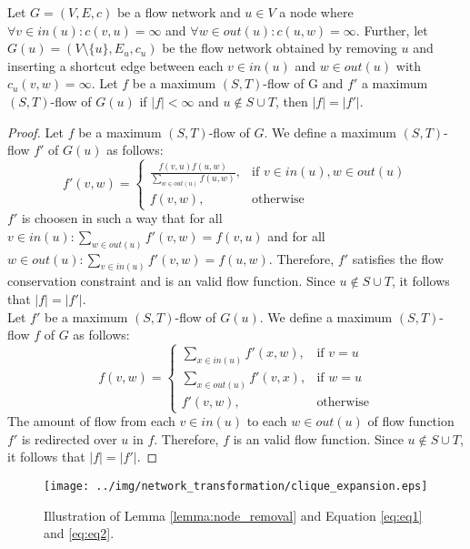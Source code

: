 \begin{lemma}
\label{lemma:node_removal}
Let $G = (V,E,c)$ be a flow network and $u \in V$ a node where
$\forall v \in in(u): c(v,u) = \infty$ and $\forall w \in out(u): c(u,w) = \infty$.
Further, let $G(u) = (V\setminus\{u\}, E_u, c_u)$ be the flow network obtained by removing
$u$ and inserting a shortcut edge between each $v \in in(u)$ and $w \in out(u)$ with $c_u(v,w) = \infty$.
Let $f$ be a maximum $(S,T)$-flow of G and $f'$ a maximum $(S,T)$-flow of
$G(u)$ if $|f| < \infty$ and $u \notin S\cup T$, then $|f| = |f'|$.
\end{lemma}

\begin{proof}
Let $f$ be a maximum $(S,T)$-flow of $G$. We define a maximum $(S,T)$-flow $f'$ 
of $G(u)$ as follows:
\begin{equation}
\label{eq:eq1}
f'(v,w) =  
  \begin{cases}
      \frac{f(v,u)f(u,w)}{\sum_{w \in out(u)} f(u,w)}, & \text{if } v \in in(u), w \in out(u) \\
      f(v,w), & \text{otherwise}
   \end{cases} 
\end{equation}
$f'$ is choosen in such a way that for all $v \in in(u): \sum_{w \in out(u)} f'(v,w) = f(v,u)$
and for all $w \in out(u): \sum_{v \in in(u)} f'(v,w) = f(u,w)$. Therefore, $f'$
satisfies the flow conservation constraint and is an valid flow function. Since
$u \notin S\cup T$, it follows that $|f| = |f'|$. \\
Let $f'$ be a maximum $(S,T)$-flow of $G(u)$. We define a maximum $(S,T)$-flow $f$
of $G$ as follows:
\begin{equation}
\label{eq:eq2}
f(v,w) =  
  \begin{cases}
      \sum_{x \in in(u)} f'(x,w), & \text{if } v = u \\
      \sum_{x \in out(u)} f'(v,x), & \text{if } w = u \\
      f'(v,w), & \text{otherwise}
   \end{cases} 
\end{equation}
The amount of flow from each $v \in in(u)$ to each $w \in out(u)$ of flow function
$f'$ is redirected over $u$ in $f$. Therefore, $f$ is an valid flow function.
Since $u \notin S\cup T$, it follows that $|f| = |f'|$.
\end{proof}

\begin{figure}
\centering
\texttt{[image: ../img/network\_transformation/clique\_expansion.eps]}
\caption{Illustration of Lemma \ref{lemma:node_removal} and Equation \ref{eq:eq1} and \ref{eq:eq2}.}
\label{img:clique_expansion}
\end{figure}


